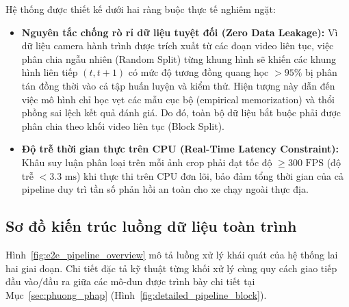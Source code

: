 Hệ thống được thiết kế dưới hai ràng buộc thực tế nghiêm ngặt:

\begin{itemize}
    \item \textbf{Nguyên tắc chống rò rỉ dữ liệu tuyệt đối (Zero Data Leakage):} Vì dữ liệu camera hành trình được trích xuất từ các đoạn video liên tục, việc phân chia ngẫu nhiên (Random Split) từng khung hình sẽ khiến các khung hình liên tiếp $(t, t + 1)$ có mức độ tương đồng quang học $> 95\%$ bị phân tán đồng thời vào cả tập huấn luyện và kiểm thử. Hiện tượng này dẫn đến việc mô hình chỉ học vẹt các mẫu cục bộ (empirical memorization) và thổi phồng sai lệch kết quả đánh giá. Do đó, toàn bộ dữ liệu bắt buộc phải được phân chia theo khối video liên tục (Block Split).
    \item \textbf{Độ trễ thời gian thực trên CPU (Real-Time Latency Constraint):} Khâu suy luận phân loại trên mỗi ảnh crop phải đạt tốc độ $\ge 300\text{ FPS}$ (độ trễ $< 3.3\text{ ms}$) khi thực thi trên CPU đơn lõi, bảo đảm tổng thời gian của cả pipeline duy trì tần số phản hồi an toàn cho xe chạy ngoài thực địa.
\end{itemize}

\subsection{Sơ đồ kiến trúc luồng dữ liệu toàn trình}
\label{subsec:so_do_luong_du_lieu}

Hình~\ref{fig:e2e_pipeline_overview} mô tả luồng xử lý khái quát của hệ thống lai hai giai đoạn. Chi tiết đặc tả kỹ thuật từng khối xử lý cùng quy cách giao tiếp đầu vào/đầu ra giữa các mô-đun được trình bày chi tiết tại Mục~\ref{sec:phuong_phap} (Hình~\ref{fig:detailed_pipeline_block}).

